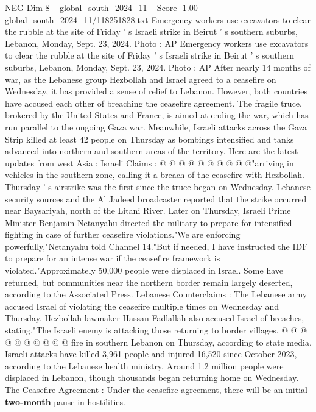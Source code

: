 \begin{textsample}{NEG Dim 8 – global\_south\_2024\_11 – Score -1.00 – global\_south\_2024\_11/118251828.txt}  \label{ex:f8_neg_316}
Emergency workers use excavators to clear the rubble at the site of Friday ' s Israeli strike in Beirut ' s southern suburbs, Lebanon, Monday, Sept. 23, 2024.
Photo : AP Emergency workers use excavators to clear the rubble at the site of Friday ' s Israeli strike in Beirut ' s southern suburbs, Lebanon, Monday, Sept. 23, 2024.
Photo : AP After nearly 14 months of war, as the Lebanese group Hezbollah and Israel agreed to a ceasefire on Wednesday, it has provided a sense of relief to Lebanon.
However, both countries have accused each other of breaching the ceasefire agreement.
The fragile truce, brokered by the United States and France, is aimed at ending the war, which has run parallel to the ongoing Gaza war.
Meanwhile, Israeli attacks across the Gaza Strip killed at least 42 people on Thursday as bombings intensified and tanks advanced into northern and southern areas of the territory.
Here are the latest updates from west Asia : Israeli Claims : @ @ @ @ @ @ @ @ @ @"arriving in vehicles in the southern zone, calling it a breach of the ceasefire with Hezbollah.
Thursday ' s airstrike was the first since the truce began on Wednesday.
Lebanese security sources and the Al Jadeed broadcaster reported that the strike occurred near Baysariyah, north of the Litani River.
Later on Thursday, Israeli Prime Minister Benjamin Netanyahu directed the military to prepare for intensified fighting in case of further ceasefire violations."We are enforcing powerfully,"Netanyahu told Channel 14."But if needed, I have instructed the IDF to prepare for an intense war if the ceasefire framework is violated."Approximately 50,000 people were displaced in Israel.
Some have returned, but communities near the northern border remain largely deserted, according to the Associated Press.
Lebanese Counterclaims : The Lebanese army accused Israel of violating the ceasefire multiple times on Wednesday and Thursday.
Hezbollah lawmaker Hassan Fadlallah also accused Israel of breaches, stating,"The Israeli enemy is attacking those returning to border villages. @ @ @ @ @ @ @ @ @ @ fire in southern Lebanon on Thursday, according to state media.
Israeli attacks have killed 3,961 people and injured 16,520 since October 2023, according to the Lebanese health ministry.
Around 1.2 million people were displaced in Lebanon, though thousands began returning home on Wednesday.
The Ceasefire Agreement : Under the ceasefire agreement, there will be an initial \textbf{two-month} pause in hostilities.

\end{textsample}
